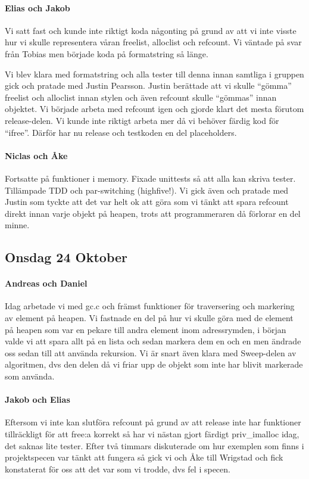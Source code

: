 \documentclass{article}
\begin{document}
\paragraph*{Elias och Jakob} Vi satt fast och kunde inte riktigt koda någonting på grund av att vi inte visste hur vi skulle representera våran freelist, alloclist och refcount. Vi väntade på svar från Tobias men började koda på formatstring så länge.

Vi blev klara med formatstring och alla tester till denna innan samtliga i gruppen gick och pratade med Justin Pearsson. Justin berättade att vi skulle “gömma” freelist och alloclist innan stylen och även refcount skulle “gömmas” innan objektet. Vi började arbeta med refcount igen och gjorde klart det mesta förutom release-delen. Vi kunde inte riktigt arbeta mer då vi behöver färdig kod för “ifree”. Därför har nu release och testkoden en del placeholders.

\paragraph*{Niclas och Åke} Fortsatte på funktioner i memory. Fixade unittests så att alla kan skriva tester. Tillämpade TDD och par-switching (highfive!). Vi gick även och pratade med Justin som tyckte att det var helt ok att göra som vi tänkt att spara refcount direkt innan varje objekt på heapen, trots att programmeraren då förlorar en del minne.


\subsection{Onsdag 24 Oktober}
\paragraph*{Andreas och Daniel} Idag arbetade vi med gc.c och främst funktioner för traversering och markering av element på heapen. Vi fastnade en del på hur vi skulle göra med de element på heapen som var en pekare till andra element inom adressrymden, i början valde vi att spara allt på en lista och sedan markera dem en och en men ändrade oss sedan till att använda rekursion. Vi är snart även klara med Sweep-delen av algoritmen, dvs den delen då vi friar upp de objekt som inte har blivit markerade som använda.

\paragraph*{Jakob och Elias} Eftersom vi inte kan slutföra refcount på grund av att release inte har funktioner tillräckligt för att free:a korrekt så har vi nästan gjort färdigt priv\_imalloc idag, det saknas lite tester. Efter två timmars diskuterade om hur exemplen som finns i projektspecen var tänkt att fungera så gick vi och Åke till Wrigstad och fick konstaterat för oss att det var som vi trodde, dvs fel i specen.
\end{document}
